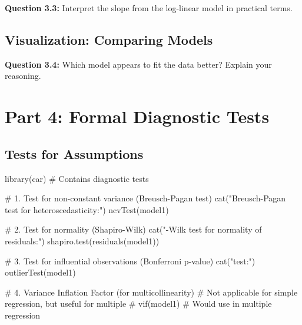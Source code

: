\documentclass[11pt]{article}
\begin{document}
\textbf{Question 3.3:} Interpret the slope from the log-linear model in practical terms.

\vspace{0.5cm}

\subsection{Visualization: Comparing Models}


\textbf{Question 3.4:} Which model appears to fit the data better? Explain your reasoning.

\vspace{0.5cm}

\section{Part 4: Formal Diagnostic Tests}

\subsection{Tests for Assumptions}

\begin{rcode}
library(car)  # Contains diagnostic tests

# 1. Test for non-constant variance (Breusch-Pagan test)
cat("Breusch-Pagan test for heteroscedasticity:\n")
ncvTest(model1)

# 2. Test for normality (Shapiro-Wilk)
cat("\nShapiro-Wilk test for normality of residuals:\n")
shapiro.test(residuals(model1))

# 3. Test for influential observations (Bonferroni p-value)
cat("\nOutlier test:\n")
outlierTest(model1)

# 4. Variance Inflation Factor (for multicollinearity)
# Not applicable for simple regression, but useful for multiple
# vif(model1)  # Would use in multiple regression
\end{rcode}
\end{document}
